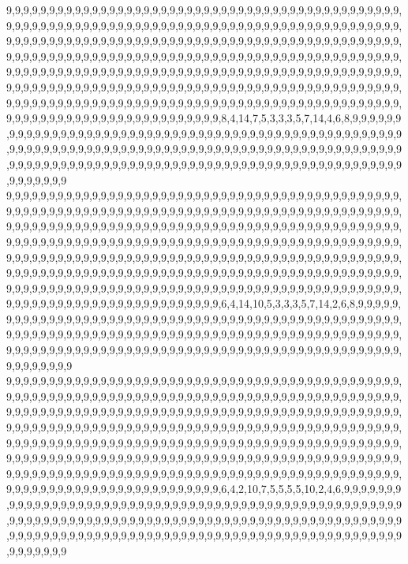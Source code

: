 9,9,9,9,9,9,9,9,9,9,9,9,9,9,9,9,9,9,9,9,9,9,9,9,9,9,9,9,9,9,9,9,9,9,9,9,9,9,9,9,9,9,9,9,9,9,9,9,9,9,9,9,9,9,9,9,9,9,9,9,9,9,9,9,9,9,9,9,9,9,9,9,9,9,9,9,9,9,9,9,9,9,9,9,9,9,9,9,9,9,9,9,9,9,9,9,9,9,9,9,9,9,9,9,9,9,9,9,9,9,9,9,9,9,9,9,9,9,9,9,9,9,9,9,9,9,9,9,9,9,9,9,9,9,9,9,9,9,9,9,9,9,9,9,9,9,9,9,9,9,9,9,9,9,9,9,9,9,9,9,9,9,9,9,9,9,9,9,9,9,9,9,9,9,9,9,9,9,9,9,9,9,9,9,9,9,9,9,9,9,9,9,9,9,9,9,9,9,9,9,9,9,9,9,9,9,9,9,9,9,9,9,9,9,9,9,9,9,9,9,9,9,9,9,9,9,9,9,9,9,9,9,9,9,9,9,9,9,9,9,9,9,9,9,9,9,9,9,9,9,9,9,9,9,9,9,9,9,9,9,9,9,9,9,9,9,9,9,9,9,9,9,9,9,9,9,9,9,9,9,9,9,9,9,9,9,9,9,9,9,9,9,9,9,9,9,9,9,9,9,9,9,9,9,9,9,9,9,9,9,9,9,9,9,9,9,9,9,9,9,9,9,9,9,9,9,9,9,9,9,9,9,9,9,9,9,9,9,9,9,9,9,9,9,9,9,9,8,4,14,7,5,3,3,3,5,7,14,4,6,8,9,9,9,9,9,9,9,9,9,9,9,9,9,9,9,9,9,9,9,9,9,9,9,9,9,9,9,9,9,9,9,9,9,9,9,9,9,9,9,9,9,9,9,9,9,9,9,9,9,9,9,9,9,9,9,9,9,9,9,9,9,9,9,9,9,9,9,9,9,9,9,9,9,9,9,9,9,9,9,9,9,9,9,9,9,9,9,9,9,9,9,9,9,9,9,9,9,9,9,9,9,9,9,9,9,9,9,9,9,9,9,9,9,9,9,9,9,9,9,9,9,9,9,9,9,9,9,9,9,9,9,9,9,9,9,9,9,9,9,9,9,9,9,9,9,9,9,9,9,9,9
9,9,9,9,9,9,9,9,9,9,9,9,9,9,9,9,9,9,9,9,9,9,9,9,9,9,9,9,9,9,9,9,9,9,9,9,9,9,9,9,9,9,9,9,9,9,9,9,9,9,9,9,9,9,9,9,9,9,9,9,9,9,9,9,9,9,9,9,9,9,9,9,9,9,9,9,9,9,9,9,9,9,9,9,9,9,9,9,9,9,9,9,9,9,9,9,9,9,9,9,9,9,9,9,9,9,9,9,9,9,9,9,9,9,9,9,9,9,9,9,9,9,9,9,9,9,9,9,9,9,9,9,9,9,9,9,9,9,9,9,9,9,9,9,9,9,9,9,9,9,9,9,9,9,9,9,9,9,9,9,9,9,9,9,9,9,9,9,9,9,9,9,9,9,9,9,9,9,9,9,9,9,9,9,9,9,9,9,9,9,9,9,9,9,9,9,9,9,9,9,9,9,9,9,9,9,9,9,9,9,9,9,9,9,9,9,9,9,9,9,9,9,9,9,9,9,9,9,9,9,9,9,9,9,9,9,9,9,9,9,9,9,9,9,9,9,9,9,9,9,9,9,9,9,9,9,9,9,9,9,9,9,9,9,9,9,9,9,9,9,9,9,9,9,9,9,9,9,9,9,9,9,9,9,9,9,9,9,9,9,9,9,9,9,9,9,9,9,9,9,9,9,9,9,9,9,9,9,9,9,9,9,9,9,9,9,9,9,9,9,9,9,9,9,9,9,9,9,9,9,9,9,9,9,9,9,9,9,9,9,9,9,9,9,9,9,9,6,4,14,10,5,3,3,3,5,7,14,2,6,8,9,9,9,9,9,9,9,9,9,9,9,9,9,9,9,9,9,9,9,9,9,9,9,9,9,9,9,9,9,9,9,9,9,9,9,9,9,9,9,9,9,9,9,9,9,9,9,9,9,9,9,9,9,9,9,9,9,9,9,9,9,9,9,9,9,9,9,9,9,9,9,9,9,9,9,9,9,9,9,9,9,9,9,9,9,9,9,9,9,9,9,9,9,9,9,9,9,9,9,9,9,9,9,9,9,9,9,9,9,9,9,9,9,9,9,9,9,9,9,9,9,9,9,9,9,9,9,9,9,9,9,9,9,9,9,9,9,9,9,9,9,9,9,9,9,9,9,9,9,9,9
9,9,9,9,9,9,9,9,9,9,9,9,9,9,9,9,9,9,9,9,9,9,9,9,9,9,9,9,9,9,9,9,9,9,9,9,9,9,9,9,9,9,9,9,9,9,9,9,9,9,9,9,9,9,9,9,9,9,9,9,9,9,9,9,9,9,9,9,9,9,9,9,9,9,9,9,9,9,9,9,9,9,9,9,9,9,9,9,9,9,9,9,9,9,9,9,9,9,9,9,9,9,9,9,9,9,9,9,9,9,9,9,9,9,9,9,9,9,9,9,9,9,9,9,9,9,9,9,9,9,9,9,9,9,9,9,9,9,9,9,9,9,9,9,9,9,9,9,9,9,9,9,9,9,9,9,9,9,9,9,9,9,9,9,9,9,9,9,9,9,9,9,9,9,9,9,9,9,9,9,9,9,9,9,9,9,9,9,9,9,9,9,9,9,9,9,9,9,9,9,9,9,9,9,9,9,9,9,9,9,9,9,9,9,9,9,9,9,9,9,9,9,9,9,9,9,9,9,9,9,9,9,9,9,9,9,9,9,9,9,9,9,9,9,9,9,9,9,9,9,9,9,9,9,9,9,9,9,9,9,9,9,9,9,9,9,9,9,9,9,9,9,9,9,9,9,9,9,9,9,9,9,9,9,9,9,9,9,9,9,9,9,9,9,9,9,9,9,9,9,9,9,9,9,9,9,9,9,9,9,9,9,9,9,9,9,9,9,9,9,9,9,9,9,9,9,9,9,9,9,9,9,9,9,9,9,9,9,9,9,9,9,9,9,9,9,9,6,4,2,10,7,5,5,5,5,10,2,4,6,9,9,9,9,9,9,9,9,9,9,9,9,9,9,9,9,9,9,9,9,9,9,9,9,9,9,9,9,9,9,9,9,9,9,9,9,9,9,9,9,9,9,9,9,9,9,9,9,9,9,9,9,9,9,9,9,9,9,9,9,9,9,9,9,9,9,9,9,9,9,9,9,9,9,9,9,9,9,9,9,9,9,9,9,9,9,9,9,9,9,9,9,9,9,9,9,9,9,9,9,9,9,9,9,9,9,9,9,9,9,9,9,9,9,9,9,9,9,9,9,9,9,9,9,9,9,9,9,9,9,9,9,9,9,9,9,9,9,9,9,9,9,9,9,9,9,9,9,9,9,9,9
